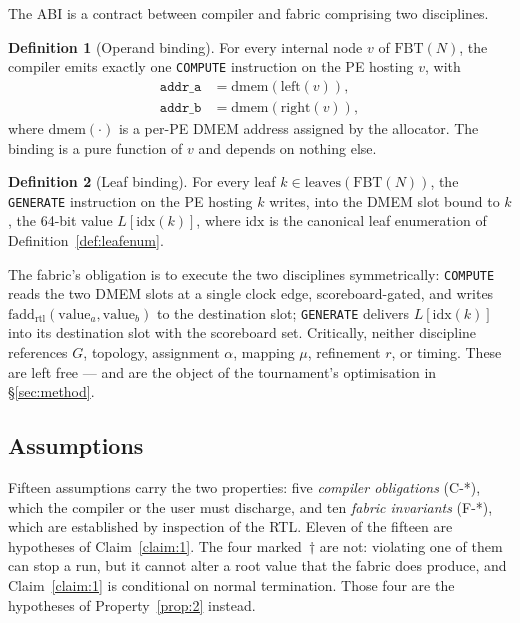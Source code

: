\documentclass[journal,10pt]{IEEEtran}
\theoremstyle{plain}
\theoremstyle{definition}
\newtheorem{definition}{Definition}
\theoremstyle{remark}
\newcommand{\FBT}{\ensuremath{\mathrm{FBT}}}
\newcommand{\fadd}{\ensuremath{\mathrm{fadd}_{\mathrm{rtl}}}}
\newcommand{\asgn}{\ensuremath{\alpha}}
\newcommand{\map}{\ensuremath{\mu}}
\begin{document}
The ABI is a contract between compiler and fabric comprising two
disciplines.

\begin{definition}[Operand binding]\label{def:opbind}
For every internal node $v$ of $\FBT(N)$, the compiler emits exactly one
\texttt{COMPUTE} instruction on the PE hosting $v$, with
\begin{align}
  \mathtt{addr\_a} &= \mathrm{dmem}(\mathrm{left}(v)),\\
  \mathtt{addr\_b} &= \mathrm{dmem}(\mathrm{right}(v)),
\end{align}
where $\mathrm{dmem}(\cdot)$ is a per-PE DMEM address assigned by the
allocator. The binding is a pure function of $v$ and depends on nothing
else.
\end{definition}

\begin{definition}[Leaf binding]\label{def:leafbind}
For every leaf $k \in \mathrm{leaves}(\FBT(N))$, the \texttt{GENERATE}
instruction on the PE hosting $k$ writes, into the DMEM slot bound to $k$,
the 64-bit value $L[\mathrm{idx}(k)]$, where $\mathrm{idx}$ is the
canonical leaf enumeration of Definition~\ref{def:leafenum}.
\end{definition}

The fabric's obligation is to execute the two disciplines symmetrically:
\texttt{COMPUTE} reads the two DMEM slots at a single clock edge,
scoreboard-gated, and writes $\fadd(\text{value}_a,
\text{value}_b)$ to the destination slot;  \texttt{GENERATE} delivers
$L[\mathrm{idx}(k)]$ into its destination slot with the scoreboard set.
Critically, neither discipline references $G$, topology, assignment
$\asgn$, mapping $\map$, refinement $r$, or timing. These are left free
--- and are the object of the tournament's optimisation in
\S\ref{sec:method}.

\subsection{Assumptions}\label{sec:abi-assumptions}

Fifteen assumptions carry the two properties: five \emph{compiler
obligations} (\textsf{C-*}), which the compiler or the user must
discharge, and ten \emph{fabric invariants} (\textsf{F-*}), which are
established by inspection of the RTL. Eleven of the fifteen are
hypotheses of Claim~\ref{claim:1}. The four marked~$\dagger$ are not:
violating one of them can stop a run, but it cannot alter a root value
that the fabric does produce, and Claim~\ref{claim:1} is conditional on
normal termination. Those four are the hypotheses of
Property~\ref{prop:2} instead.
\end{document}
